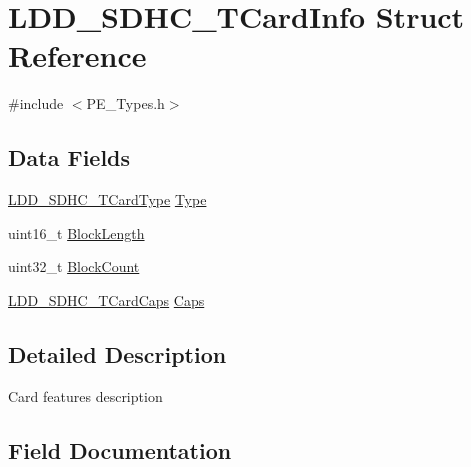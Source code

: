 \hypertarget{struct_l_d_d___s_d_h_c___t_card_info}{}\section{L\+D\+D\+\_\+\+S\+D\+H\+C\+\_\+\+T\+Card\+Info Struct Reference}
\label{struct_l_d_d___s_d_h_c___t_card_info}


{\ttfamily \#include $<$P\+E\+\_\+\+Types.\+h$>$}

\subsection*{Data Fields}
\begin{DoxyCompactItemize}
\item 
\hyperlink{group___p_e___types__module_ga5344ded013ca3da273ed4f52c9c96fc7}{L\+D\+D\+\_\+\+S\+D\+H\+C\+\_\+\+T\+Card\+Type} \hyperlink{struct_l_d_d___s_d_h_c___t_card_info_ab2b86f6fe821778459edd351d08eb4bd}{Type}
\item 
uint16\+\_\+t \hyperlink{struct_l_d_d___s_d_h_c___t_card_info_a46cbdea4ece83eeaa17410e9763cc3a9}{Block\+Length}
\item 
uint32\+\_\+t \hyperlink{struct_l_d_d___s_d_h_c___t_card_info_aaf0587f4fc0e52a160d0ac2a1106c4e9}{Block\+Count}
\item 
\hyperlink{struct_l_d_d___s_d_h_c___t_card_caps}{L\+D\+D\+\_\+\+S\+D\+H\+C\+\_\+\+T\+Card\+Caps} \hyperlink{struct_l_d_d___s_d_h_c___t_card_info_a591c22d1aa49944325b35c63d2bf8199}{Caps}
\end{DoxyCompactItemize}


\subsection{Detailed Description}
Card features description 

\subsection{Field Documentation}
\mbox{\label{struct_l_d_d___s_d_h_c___t_card_info_aaf0587f4fc0e52a160d0ac2a1106c4e9}} 
